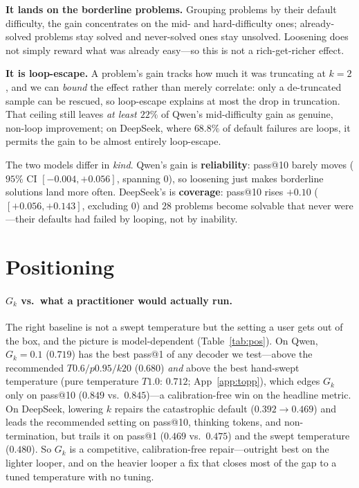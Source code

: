 \documentclass[11pt]{article}                       %
\begin{document}
\textbf{It lands on the borderline problems.} Grouping problems by their default difficulty, the gain
concentrates on the mid- and hard-difficulty ones; already-solved problems stay solved and never-solved
ones stay unsolved. Loosening does not simply reward what was already easy---so this is not a
rich-get-richer effect.

\textbf{It is loop-escape.} A problem's gain tracks how much it was truncating at $k{=}2$, and we can
\emph{bound} the effect rather than merely correlate: only a de-truncated sample can be rescued, so
loop-escape explains at most the drop in truncation. That ceiling still leaves \emph{at least $22\%$}
of Qwen's mid-difficulty gain as genuine, non-loop improvement; on DeepSeek, where $68.8\%$ of default
failures are loops, it permits the gain to be almost entirely loop-escape.

The two models differ in \emph{kind}. Qwen's gain is \textbf{reliability}: pass@10 barely moves
($95\%$ CI $[-0.004,+0.056]$, spanning 0), so loosening just makes borderline solutions land more
often. DeepSeek's is \textbf{coverage}: pass@10 rises $+0.10$ ($[+0.056,+0.143]$, excluding 0) and $28$
problems become solvable that never were---their defaults had failed by looping, not by inability.

\section{Positioning}\label{sec:pos}
\paragraph{$G_k$ vs.\ what a practitioner would actually run.} The right baseline is not a swept
temperature but the setting a user gets out of the box, and the picture is model-dependent
(Table~\ref{tab:pos}). On Qwen, $G_k{=}0.1$ ($0.719$) has the best pass@1 of any decoder we test---above
the recommended $T0.6/p0.95/k20$ ($0.680$) \emph{and} above the best hand-swept temperature (pure
temperature $T1.0$: $0.712$; App~\ref{app:topp}), which edges $G_k$ only on pass@10 ($0.849$ vs.\
$0.845$)---a calibration-free win on the headline metric. On DeepSeek, lowering $k$ repairs the catastrophic default ($0.392\!\to\!0.469$)
and leads the recommended setting on pass@10, thinking tokens, and non-termination, but trails it on
pass@1 ($0.469$ vs.\ $0.475$) and the swept temperature ($0.480$). So $G_k$ is a competitive,
calibration-free repair---outright best on the lighter looper, and on the heavier looper a fix that
closes most of the gap to a tuned temperature with no tuning.
\end{document}
